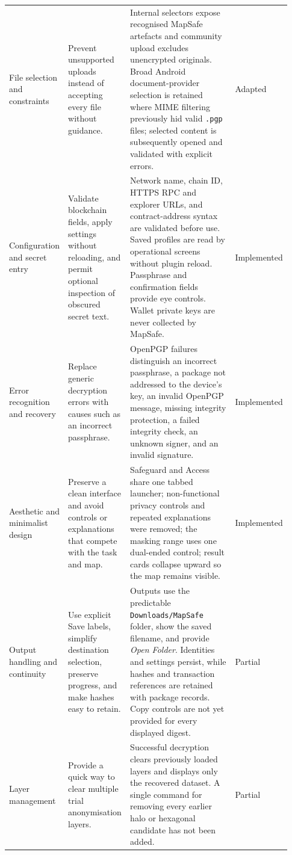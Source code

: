 \documentclass[]{interact}
\begin{document}
{\begin{longtable}{@{}p{0.16\linewidth}p{0.22\linewidth}p{0.40\linewidth}p{0.15\linewidth}@{}}
File selection and constraints & Prevent unsupported uploads instead of accepting every file without guidance. & Internal selectors expose recognised MapSafe artefacts and community upload excludes unencrypted originals. Broad Android document-provider selection is retained where MIME filtering previously hid valid \texttt{.pgp} files; selected content is subsequently opened and validated with explicit errors. & Adapted \\

Configuration and secret entry & Validate blockchain fields, apply settings without reloading, and permit optional inspection of obscured secret text. & Network name, chain ID, HTTPS RPC and explorer URLs, and contract-address syntax are validated before use. Saved profiles are read by operational screens without plugin reload. Passphrase and confirmation fields provide eye controls. Wallet private keys are never collected by MapSafe. & Implemented \\

Error recognition and recovery & Replace generic decryption errors with causes such as an incorrect passphrase. & OpenPGP failures distinguish an incorrect passphrase, a package not addressed to the device's key, an invalid OpenPGP message, missing integrity protection, a failed integrity check, an unknown signer, and an invalid signature. & Implemented \\

Aesthetic and minimalist design & Preserve a clean interface and avoid controls or explanations that compete with the task and map. & Safeguard and Access share one tabbed launcher; non-functional privacy controls and repeated explanations were removed; the masking range uses one dual-ended control; result cards collapse upward so the map remains visible. & Implemented \\

Output handling and continuity & Use explicit Save labels, simplify destination selection, preserve progress, and make hashes easy to retain. & Outputs use the predictable \texttt{Downloads/MapSafe} folder, show the saved filename, and provide \emph{Open Folder}. Identities and settings persist, while hashes and transaction references are retained with package records. Copy controls are not yet provided for every displayed digest. & Partial \\

Layer management & Provide a quick way to clear multiple trial anonymisation layers. & Successful decryption clears previously loaded layers and displays only the recovered dataset. A single command for removing every earlier halo or hexagonal candidate has not been added. & Partial \\


\end{longtable}}
\end{document}
